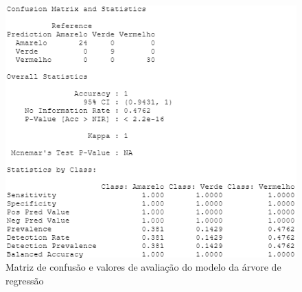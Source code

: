 \documentclass[conference]{IEEEtran}
\begin{document}
\begin{figure}[htbp]
\centerline{\includegraphics[width=0.95\columnwidth]{images/08_2.png}}
\caption{Matriz de confusão e valores de avaliação do modelo da árvore de regressão}
\label{8a_confusionmatrix}
\end{figure}
\end{document}
